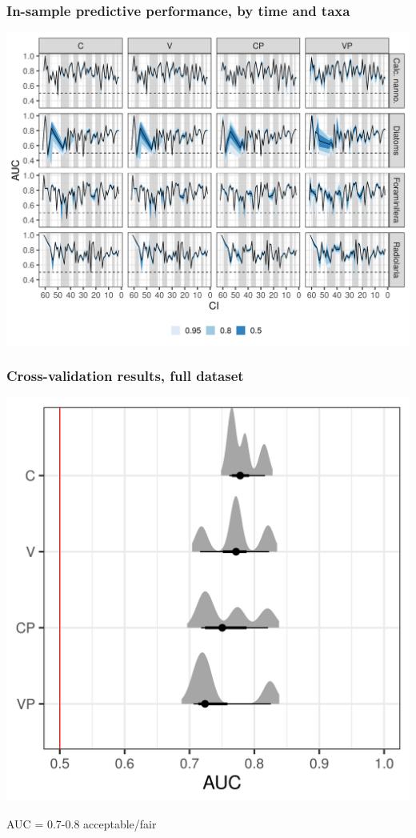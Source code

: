 \documentclass{beamer}
\begin{document}
\begin{frame}
  \frametitle{In-sample predictive performance, by time and taxa}

  \begin{center}
    \includegraphics[width=\textwidth,height=0.8\textheight,keepaspectratio=true]{../results/figure/auc_taxon_time_full}
  \end{center}

\end{frame}

\begin{frame}
  \frametitle{Cross-validation results, full dataset}

  \begin{center}
    \includegraphics[width=\textwidth,height=0.8\textheight,keepaspectratio=true]{../results/figure/fold_auc_zoom_full}

    \footnotesize{AUC = 0.7-0.8 acceptable/fair}
  \end{center}

\end{frame}
\end{document}
